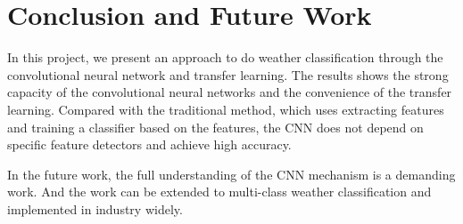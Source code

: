 \section{Conclusion and Future Work}

In this project, we present an approach to do weather classification through the convolutional neural network and transfer learning. The results shows the strong capacity of the convolutional neural networks and the convenience of the transfer learning. Compared with the traditional method, which uses extracting features and training a classifier based on the features, the CNN does not depend on specific feature detectors and achieve high accuracy. 

In the future work, the full understanding of the CNN mechanism is a demanding work. And the work can be extended to multi-class weather classification and implemented in industry widely.